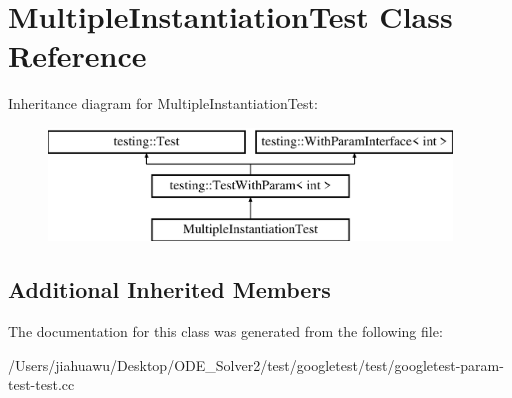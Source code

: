 \hypertarget{class_multiple_instantiation_test}{}\section{Multiple\+Instantiation\+Test Class Reference}
\label{class_multiple_instantiation_test}
Inheritance diagram for Multiple\+Instantiation\+Test\+:\begin{figure}[H]
\begin{center}
\leavevmode
\includegraphics[height=3.000000cm]{class_multiple_instantiation_test}
\end{center}
\end{figure}
\subsection*{Additional Inherited Members}


The documentation for this class was generated from the following file\+:\begin{DoxyCompactItemize}
\item 
/\+Users/jiahuawu/\+Desktop/\+O\+D\+E\+\_\+\+Solver2/test/googletest/test/googletest-\/param-\/test-\/test.\+cc\end{DoxyCompactItemize}
